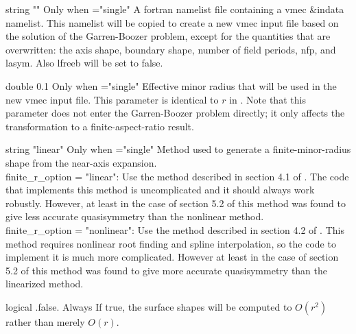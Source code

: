 \myhrule

{string}
{{\ttfamily ""}}
{Only when ={\ttfamily "single"}}
{A fortran namelist file containing a vmec {\ttfamily \&indata} namelist. This namelist will be copied to create a new vmec input file based on the solution of the Garren-Boozer problem, except for the quantities that are overwritten: the axis shape, boundary shape, number of field periods, {\ttfamily nfp}, and {\ttfamily lasym}. Also {\ttfamily lfreeb} will be set to false.}

\myhrule

{double}
{0.1}
{Only when ={\ttfamily "single"}}
{Effective minor radius that will be used in the new vmec input file.  This parameter is identical to $r$ in \cite{PaperII}. Note that this parameter does not enter the Garren-Boozer problem directly; it only affects the transformation to a finite-aspect-ratio result.}

\myhrule

{string}
{{\ttfamily "linear"}}
{Only when ={\ttfamily "single"}}
{Method used to generate a finite-minor-radius shape from the near-axis expansion.\\

{\ttfamily finite\_r\_option} = {\ttfamily "linear"}: Use the method described in section 4.1 of \cite{PaperII}. The code that implements this method is uncomplicated and it should always work robustly. However, at least in the case of
section 5.2 of \cite{PaperII} this method was found to give less accurate quasisymmetry than the nonlinear method.
 \\

{\ttfamily finite\_r\_option} = {\ttfamily "nonlinear"}: Use the method described in section 4.2 of \cite{PaperII}. 
This method requires nonlinear root finding and spline interpolation, so the code to implement it is much more complicated. However at least in the case of section 5.2 of \cite{PaperII} this method was found to give more accurate quasisymmetry than the linearized method.
}

\myhrule

{logical}
{{\ttfamily .false.}}
{Always}
{If true, the surface shapes will be computed to $O(r^2)$ rather than merely $O(r)$.}

\myhrule


